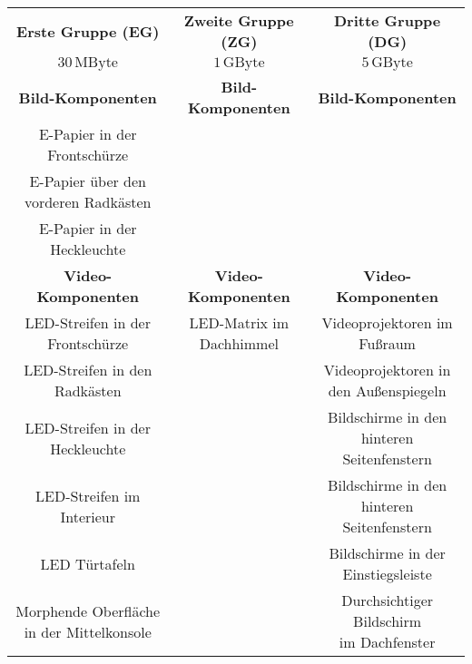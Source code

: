 \begin{table}[hbt]	
	\centering
	\renewcommand{\arraystretch}{1.5}	%
	\label{tab:Einteilung}
	\begin{tabular}{c|c|c}
		\textbf{Erste Gruppe (EG\nomenclature{EG}{Erste Gruppe})} & \textbf{Zweite Gruppe (ZG\nomenclature{ZG}{Zweite Gruppe})} & \textbf{Dritte Gruppe (DG\nomenclature{DG}{Dritte Gruppe})} \\ 
		$ 30\,\mathrm{MByte} $ & $ 1\,\mathrm{GByte} $ & $ 5\,\mathrm{GByte} $ \\
		\hline
		\hline
		\textbf{Bild-Komponenten} & \textbf{Bild-Komponenten} & \textbf{Bild-Komponenten} \\
		\parbox[t]{0.3\linewidth}{\centering E-Papier in der Frontschürze} &  &  \\
		\parbox[t]{0.3\linewidth}{\centering E-Papier über den vorderen Radkästen} &  & \\
		\parbox[t]{0.3\linewidth}{\centering E-Papier in der Heckleuchte} &  &  \\
		\textbf{Video-Komponenten} & \textbf{Video-Komponenten} & \textbf{Video-Komponenten} \\
		\parbox[t]{0.3\linewidth}{\centering LED-Streifen in der Frontschürze} & \parbox[t]{0.3\linewidth}{\centering LED-Matrix im Dachhimmel} & \parbox[t]{0.3\linewidth}{\centering Videoprojektoren im Fußraum} \\
		\parbox[t]{0.3\linewidth}{\centering LED-Streifen in den Radkästen} &  & \parbox[t]{0.3\linewidth}{\centering Videoprojektoren in\\den Außenspiegeln} \\ 
		\parbox[t]{0.3\linewidth}{\centering LED-Streifen in der Heckleuchte} &  & \parbox[t]{0.3\linewidth}{\centering Bildschirme in den\\hinteren Seitenfenstern} \\ 
		\parbox[t]{0.3\linewidth}{\centering LED-Streifen im Interieur} &  & \parbox[t]{0.3\linewidth}{\centering Bildschirme in den\\hinteren Seitenfenstern} \\
		\parbox[t]{0.3\linewidth}{\centering LED Türtafeln} & & \parbox[t]{0.3\linewidth}{\centering  Bildschirme in der Einstiegsleiste} \\
		\parbox[t]{0.3\linewidth}{\centering Morphende Oberfläche\\in der Mittelkonsole} & & \parbox[t]{0.3\linewidth}{\centering Durchsichtiger Bildschirm\\im Dachfenster} \\
	\end{tabular} 
\end{table}
